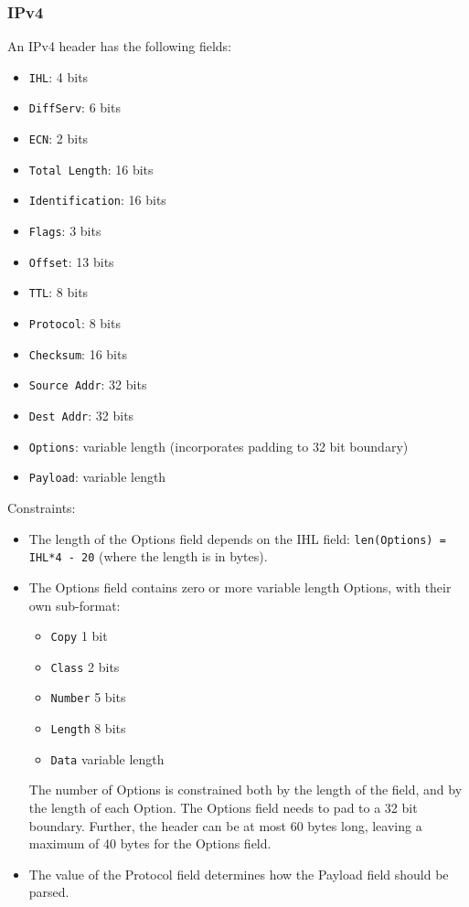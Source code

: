 \documentclass[10pt]{article}
\begin{document}
\subsubsection*{IPv4}

An IPv4 header has the following fields:
\begin{itemize}
\item \texttt{IHL}: 4 bits
\item \texttt{DiffServ}: 6 bits
\item \texttt{ECN}: 2 bits
\item \texttt{Total Length}: 16 bits
\item \texttt{Identification}: 16 bits
\item \texttt{Flags}: 3 bits
\item \texttt{Offset}: 13 bits
\item \texttt{TTL}: 8 bits
\item \texttt{Protocol}: 8 bits
\item \texttt{Checksum}: 16 bits
\item \texttt{Source Addr}: 32 bits
\item \texttt{Dest Addr}: 32 bits
\item \texttt{Options}: variable length (incorporates padding to 32 bit boundary)
\item \texttt{Payload}: variable length
\end{itemize}

Constraints:
\begin{itemize}
\item The length of the Options field depends on the IHL field:
\texttt{len(Options) = IHL*4 - 20} (where the length is in bytes).
\item The Options field contains zero or more variable length Options, with their own
sub-format:
\begin{itemize}
\item \texttt{Copy} 1 bit
\item \texttt{Class} 2 bits
\item \texttt{Number} 5 bits
\item \texttt{Length} 8 bits
\item \texttt{Data} variable length
\end{itemize}
The number of Options is constrained both by the length of the field, and by the length
of each Option. The Options field needs to pad to a 32 bit boundary. Further, the
header can be at most 60 bytes long, leaving a maximum of 40 bytes for the Options field.
\item The value of the Protocol field determines how the Payload field should be parsed.
\end{itemize}
\end{document}
